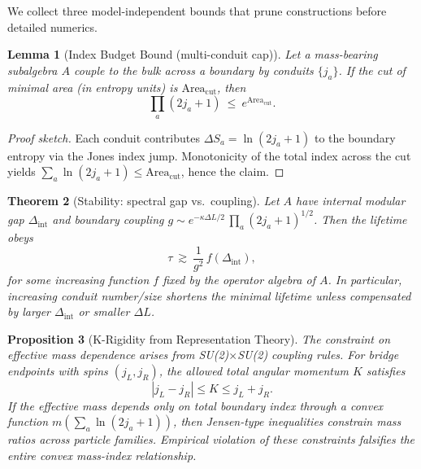 \documentclass[11pt]{article}
\theoremstyle{plain}
\newtheorem{theorem}{Theorem}[section]
\newtheorem{lemma}[theorem]{Lemma}
\newtheorem{proposition}[theorem]{Proposition}
\theoremstyle{definition}
\begin{document}
We collect three model-independent bounds that prune constructions before detailed numerics.

\begin{lemma}[Index Budget Bound (multi-conduit cap)]\label{lem:index-budget}
  Let a mass-bearing subalgebra $A$ couple to the bulk across a boundary by conduits $\{j_a\}$. If the cut of minimal area (in entropy units) is $\mathrm{Area}_{\mathrm{cut}}$, then
  \begin{equation}
    \prod_a (2j_a+1)\ \le\ e^{\mathrm{Area}_{\mathrm{cut}}}.
  \end{equation}
\end{lemma}
\begin{proof}[Proof sketch]
  Each conduit contributes $\Delta S_a=\ln(2j_a+1)$ to the boundary entropy via the Jones index jump. Monotonicity of the total index across the cut yields $\sum_a \ln(2j_a+1)\le \mathrm{Area}_{\mathrm{cut}}$, hence the claim.
\end{proof}

\begin{theorem}[Stability: spectral gap vs.\ coupling]\label{thm:stability}
  Let $A$ have internal modular gap $\Delta_{\mathrm{int}}$ and boundary coupling
  $g \sim e^{-\kappa \Delta L/2}\,\prod_a (2j_a+1)^{1/2}$. Then the lifetime obeys
  \begin{equation}
    \tau \ \gtrsim\ \frac{1}{g^2}\,f(\Delta_{\mathrm{int}}),
  \end{equation}
  for some increasing function $f$ fixed by the operator algebra of $A$. In particular, increasing conduit number/size shortens the minimal lifetime unless compensated by larger $\Delta_{\mathrm{int}}$ or smaller $\Delta L$.
\end{theorem}

\begin{proposition}[K-Rigidity from Representation Theory]\label{prop:k-rigidity}
  The constraint on effective mass dependence arises from SU(2)$\times$SU(2) coupling rules. For bridge endpoints with spins $(j_L, j_R)$, the allowed total angular momentum $K$ satisfies
  \begin{equation}
    |j_L - j_R| \leq K \leq j_L + j_R.
  \end{equation}
  If the effective mass depends only on total boundary index through a convex function $m(\sum_a \ln(2j_a+1))$, then Jensen-type inequalities constrain mass ratios across particle families. Empirical violation of these constraints falsifies the entire convex mass-index relationship.
\end{proposition}
\end{document}
